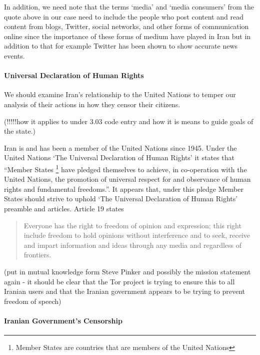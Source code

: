 \documentclass[11pt]{article}
\begin{document}
\begin{multicols}{2}
In addition, we need note that the terms `media' and `media consumers' from the
quote above in our case need to include the people who post content and read
content from blogs, Twitter, social networks, and other forms of communication
online since the importance of these forms of medium have played in Iran but in
addition to that for example Twitter has been shown to show accurate news
events.  \cite{Twitter:BreakingNewsDetection, Twitter:IdentificationLiveEvents,
Twitter:MeasuringInfluence}


\paragraph{Universal Declaration of Human Rights}

We should examine Iran's relationship to the United Nations to temper our
analysis of their actions in how they censor their citizens. 

(!!!!!how it applies to under 3.03 code entry and how it is means to guide goals
of the state.)

Iran is and has been a member of the United Nations since 1945.
\cite{UN:IranBecameMember, UN:IranActiveMember} Under the United Nations `The
Universal Declaration of Human Rights' it states that ``Member States
\footnote{Member States are countries that are members of the United Nations}
have pledged themselves to achieve, in co-operation with the United Nations, the
promotion of universal respect for and observance of human rights and
fundamental freedoms.''\cite{UniversalDeclerationOfHumanRights}. It appears
that, under this pledge Member States should strive to uphold `The Universal
Declaration of Human Rights' preamble and articles. Article 19 states

\begin{quotation} 
  Everyone has the right to freedom of opinion and expression;
  this right include freedom to hold opinions without interference and to seek,
  receive and impart information and ideas through any media and regardless of
  frontiers.  \cite{UniversalDeclerationOfHumanRights}
\end{quotation}

(put in mutual knowledge form Steve Pinker and possibly the mission statement
again - it should be clear that the Tor project is trying to ensure this to all
Iranian users and that the Iranian government appears to be trying to prevent
freedom of speech)


\paragraph{Iranian Government's Censorship}



\end{multicols}
\end{document}
